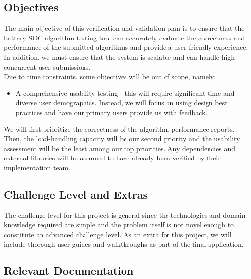 \documentclass[12pt, titlepage]{article}
\begin{document}
\subsection{Objectives}

The main objective of this verification and validation plan is to ensure that the battery SOC algorithm testing tool can accurately evaluate the correctness and performance of the submitted algorithms and provide a user-friendly experience. In addition, we must ensure that the system is scalable and can handle high concurrent user submissions. \\
\newline Due to time constraints, some objectives will be out of scope, namely:
\begin{itemize}
    \item A comprehensive usability testing - this will require significant time and diverse user demographics. Instead, we will focus on using design best practices and have our primary users provide us with feedback.
\end{itemize}
We will first prioritize the correctness of the algorithm performance reports. Then, the load-handling capacity will be our second priority and the usability assessment will be the least among our top priorities. Any dependencies and external libraries will be assumed to have already been verified by their implementation team.

\subsection{Challenge Level and Extras}

The challenge level for this project is general since the technologies and domain knowledge required are simple and the problem itself is not novel enough to constitute an advanced challenge level. As an extra for this project, we will include thorough user guides and walkthroughs as part of the final application.

\subsection{Relevant Documentation}
\end{document}
